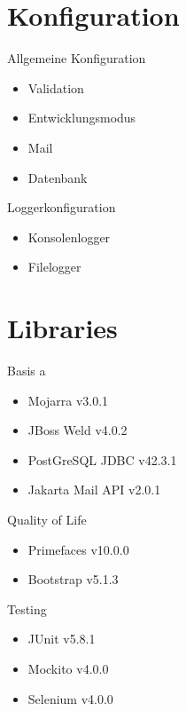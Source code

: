 \documentclass{beamer}
\begin{document}
    \section{Konfiguration}
    \begin{frame}{Allgemeine Konfiguration}
        \begin{itemize}
            \item Validation
            \pause
            \item Entwicklungsmodus
            \pause
            \item Mail
            \pause
            \item Datenbank
        \end{itemize}
    \end{frame}

    \begin{frame}{Loggerkonfiguration}
        \begin{itemize}
            \item Konsolenlogger
            \pause
            \item Filelogger
        \end{itemize}
    \end{frame}


    \section{Libraries}
    \begin{frame}{Basis}
        a
        \begin{itemize}
            \item Mojarra v3.0.1
            \item JBoss Weld v4.0.2
            \item PostGreSQL JDBC v42.3.1
            \item Jakarta Mail API v2.0.1
        \end{itemize}
    \end{frame}

    \begin{frame}{Quality of Life}
        \begin{itemize}
            \item Primefaces v10.0.0
            \item Bootstrap v5.1.3
        \end{itemize}
    \end{frame}

    \begin{frame}{Testing}
        \begin{itemize}
            \item JUnit v5.8.1
            \item Mockito v4.0.0
            \item Selenium v4.0.0
        \end{itemize}
    \end{frame}
\end{document}
